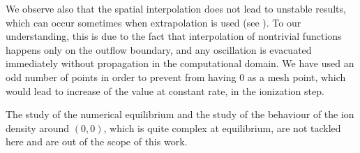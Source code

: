 \documentclass{article}
\numberwithin{equation}{section}
\begin{document}
%
%
%
%

We \textcolor{black}{observe} also that the spatial interpolation does not lead to unstable results, which can occur sometimes when extrapolation is used (see \cite{badsiNumericalStabilityPlasma2018}). 
To our understanding, this is due to the fact that interpolation of nontrivial functions happens only on the outflow boundary, and any oscillation is evacuated immediately without propagation in the computational domain. 
We have used an odd number of points in order to prevent from having $0$ as a mesh point, which would lead to increase of the value at constant rate, in the ionization step.

The study of the numerical equilibrium and the study of the behaviour of the ion density around $(0,0)$, which is quite complex at equilibrium, are not tackled here and are out of the scope of this work.
\end{document}
